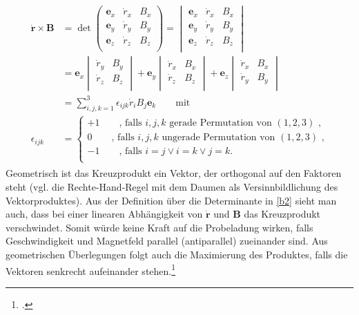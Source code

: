 \begin{eqnarray}
\begin{alignedat}{2}
\label{b2}
\boldsymbol{\dot{r}}\times \boldsymbol{B}& = \det 
\begin{pmatrix}  
\boldsymbol{e}_x & \dot{r}_x & B_x \\
\boldsymbol{e}_y & \dot{r}_y & B_y \\
\boldsymbol{e}_z & \dot{r}_z & B_z \\
\end{pmatrix}
= \begin{vmatrix}  
\boldsymbol{e}_x & \dot{r}_x & B_x \\
\boldsymbol{e}_y & \dot{r}_y & B_y \\
\boldsymbol{e}_z & \dot{r}_z & B_z \\
\end{vmatrix}
\\
& = \boldsymbol{e}_x
\begin{vmatrix}  
\dot{r}_y & B_y\\
\dot{r}_z & B_z\\
\end{vmatrix}
+ \boldsymbol{e}_y
\begin{vmatrix} 
\dot{r}_x & B_x\\
\dot{r}_z & B_z\\
\end{vmatrix}
+ \boldsymbol{e}_z
\begin{vmatrix} 
\dot{r}_x & B_x\\
\dot{r}_y & B_y\\
\end{vmatrix}\\
& = \sum_{i,j,k=1}^{3}\epsilon_{ijk}\dot{r}_iB_j\boldsymbol{e}_k\qquad\text{mit }\\
\epsilon_{ijk} & =
\begin{cases}
+1 \qquad\text{, falls }i,j,k\text{ gerade Permutation von }(1,2,3) \text{ ,} \\
0 \qquad\text{, falls }i,j,k\text{ ungerade Permutation von }(1,2,3) \text{ ,} \\
-1 \qquad\text{, falls } i=j \vee i=k \vee j=k. \\
\end{cases}
\end{alignedat}
\end{eqnarray}
Geometrisch ist das Kreuzprodukt ein Vektor, der orthogonal auf den Faktoren steht (vgl. die Rechte-Hand-Regel mit dem Daumen als Versinnbildlichung des Vektorproduktes). Aus der Definition über die Determinante in \eqref{b2} sieht man auch, dass bei einer linearen Abhängigkeit von $\boldsymbol{\dot{r}}$ und $\boldsymbol{B}$ das Kreuzprodukt verschwindet. Somit würde keine Kraft auf die Probeladung wirken, falls Geschwindigkeit und Magnetfeld parallel (antiparallel) zueinander sind. Aus geometrischen Überlegungen folgt auch die Maximierung des Produktes, falls die Vektoren senkrecht aufeinander stehen.\footcite[vgl.][S.\,925]{Tipler2010}\par
